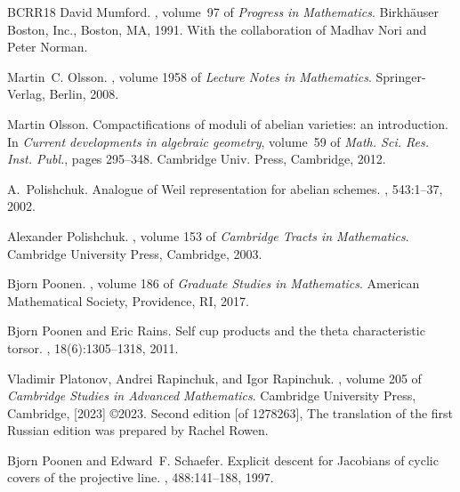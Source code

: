 \begin{thebibliography}{BCRR18}
David Mumford.
, volume~97 of {\em Progress in
  Mathematics}.
\newblock Birkh\"{a}user Boston, Inc., Boston, MA, 1991.
\newblock With the collaboration of Madhav Nori and Peter Norman.

Martin~C. Olsson.
, volume 1958
  of {\em Lecture Notes in Mathematics}.
\newblock Springer-Verlag, Berlin, 2008.

Martin Olsson.
\newblock Compactifications of moduli of abelian varieties: an introduction.
\newblock In {\em Current developments in algebraic geometry}, volume~59 of
  {\em Math. Sci. Res. Inst. Publ.}, pages 295--348. Cambridge Univ. Press,
  Cambridge, 2012.

A.~Polishchuk.
\newblock Analogue of {W}eil representation for abelian schemes.
, 543:1--37, 2002.

Alexander Polishchuk.
,
  volume 153 of {\em Cambridge Tracts in Mathematics}.
\newblock Cambridge University Press, Cambridge, 2003.

Bjorn Poonen.
, volume 186 of {\em Graduate
  Studies in Mathematics}.
\newblock American Mathematical Society, Providence, RI, 2017.

Bjorn Poonen and Eric Rains.
\newblock Self cup products and the theta characteristic torsor.
, 18(6):1305--1318, 2011.

Vladimir Platonov, Andrei Rapinchuk, and Igor Rapinchuk.
, volume 205 of
  {\em Cambridge Studies in Advanced Mathematics}.
\newblock Cambridge University Press, Cambridge, [2023] \copyright 2023.
\newblock Second edition [of 1278263], The translation of the first Russian
  edition was prepared by Rachel Rowen.

Bjorn Poonen and Edward~F. Schaefer.
\newblock Explicit descent for {J}acobians of cyclic covers of the projective
  line.
, 488:141--188, 1997.


\end{thebibliography}
